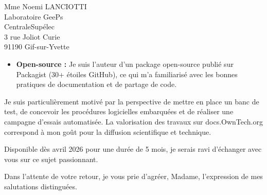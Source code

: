 \documentclass[11pt,a4paper]{letter}
\begin{document}
\begin{letter}{Mme Noemi LANCIOTTI\\Laboratoire GeePs\\CentraleSupélec\\3 rue Joliot Curie\\91190 Gif-sur-Yvette}
\begin{itemize}
    \item \textbf{Open-source :} Je suis l'auteur d'un package open-source publié sur Packagist (30+ étoiles GitHub), ce qui m'a familiarisé avec les bonnes pratiques de documentation et de partage de code.
\end{itemize}

Je suis particulièrement motivé par la perspective de mettre en place un banc de test, de concevoir les procédures logicielles embarquées et de réaliser une campagne d'essais automatisée. La valorisation des travaux sur docs.OwnTech.org correspond à mon goût pour la diffusion scientifique et technique.

Disponible dès avril 2026 pour une durée de 5 mois, je serais ravi d'échanger avec vous sur ce sujet passionnant.

\closing{Dans l'attente de votre retour, je vous prie d'agréer, Madame, l'expression de mes salutations distinguées.}

\end{letter}
\end{document}
